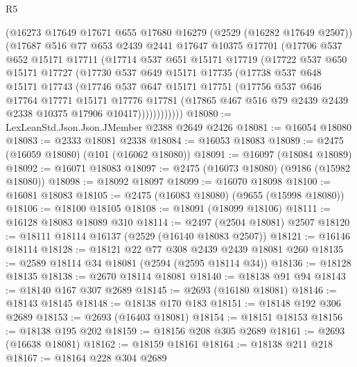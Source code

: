 \begin{lexlean}{R5}
\begin{coremodule}
        (@16273
          @17649
          @17671
          @655
          @17680
          @16279
          (@2529 (@16282 @17649 @2507))
          (@17687
            @516
            @77
            @653
            @2439
            @2441
            @17647
            @10375
            @17701
            (@17706
              @537
              @652
              @15171
              @17711
              (@17714
                @537
                @651
                @15171
                @17719
                (@17722
                  @537
                  @650
                  @15171
                  @17727
                  (@17730
                    @537
                    @649
                    @15171
                    @17735
                    (@17738
                      @537
                      @648
                      @15171
                      @17743
                      (@17746
                        @537
                        @647
                        @15171
                        @17751
                        (@17756
                          @537
                          @646
                          @17764
                          @17771
                          @15171
                          @17776
                          @17781
                          (@17865 @467 @516 @79 @2439 @2439 @2338 @10375 @17906 @10417))))))))))))
@18080 := LexLeanStd.Json.Json.JMember @2388 @2649 @2426
@18081 := @16054 @18080
@18083 := @2333 @18081 @2338
@18084 := @16053 @18083
@18089 := @2475 (@16059 @18080) (@101 (@16062 @18080))
@18091 := @16097 (@18084 @18089)
@18092 := @16071 @18083
@18097 := @2475 (@16073 @18080) (@9186 (@15982 @18080))
@18098 := @18092 @18097
@18099 := @16070 @18098
@18100 := @16081 @18083
@18105 := @2475 (@16083 @18080) (@9655 (@15998 @18080))
@18106 := @18100 @18105
@18108 := @18091 (@18099 @18106)
@18111 := @16128 @18083 @18089 @310
@18114 := @2497 (@2504 @18081) @2507
@18120 := @18111 @18114 @16137 (@2529 (@16140 @18083 @2507))
@18121 := @16146 @18114
@18128 := @18121 @22 @77 @308 @2439 @2439 @18081 @260
@18135 := @2589 @18114 @34 @18081 (@2594 (@2595 @18114 @34))
@18136 := @18128 @18135
@18138 := @2670 @18114 @18081
@18140 := @18138 @91 @94
@18143 := @18140 @167 @307 @2689
@18145 := @2693 (@16180 @18081)
@18146 := @18143 @18145
@18148 := @18138 @170 @183
@18151 := @18148 @192 @306 @2689
@18153 := @2693 (@16403 @18081)
@18154 := @18151 @18153
@18156 := @18138 @195 @202
@18159 := @18156 @208 @305 @2689
@18161 := @2693 (@16638 @18081)
@18162 := @18159 @18161
@18164 := @18138 @211 @218
@18167 := @18164 @228 @304 @2689

\end{coremodule}
\end{lexlean}
